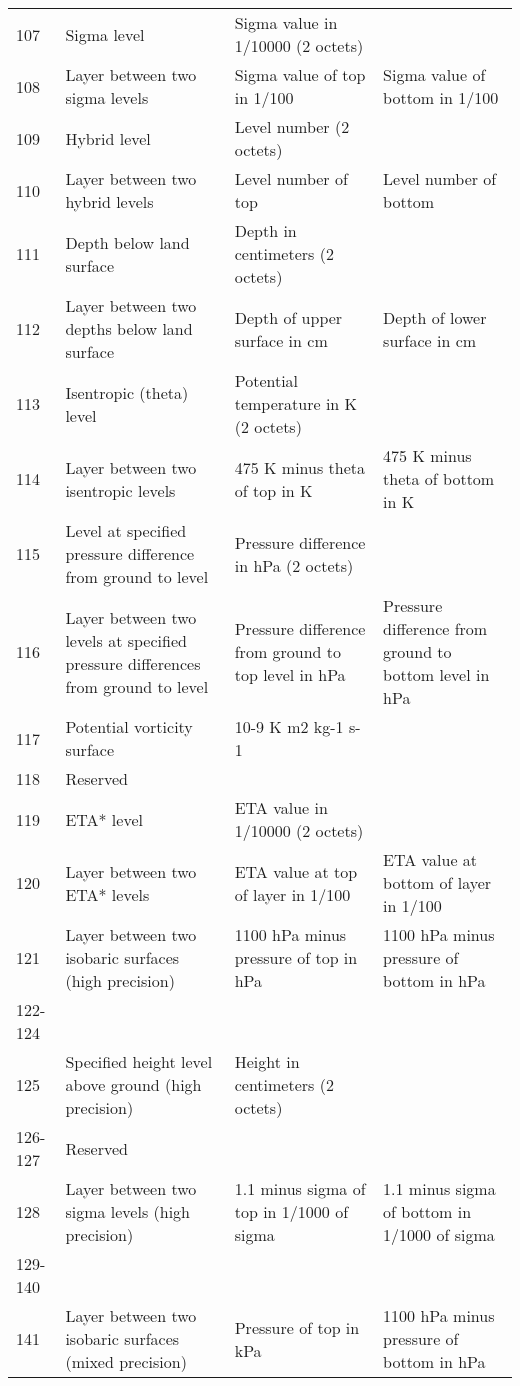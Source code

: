 \documentclass[draft,12pt,a4paper,twoside]{book}
\begin{document}
\begin{scriptsize}
\begin{longtable}{|@{\hspace{0.5mm}}l@{\hspace{0.5mm}}|@{\hspace{0.5mm}}p{4.0cm}@{\hspace{0.5mm}}|@{\hspace{0.5mm}}p{4.0cm}@{\hspace{0.5mm}}|@{\hspace{0.5mm}}p{4.0cm}@{\hspace{0.5mm}}|}
107     & Sigma level & Sigma value in 1/10000 (2 octets) & \\
108     & Layer between two sigma levels & Sigma value of top in 1/100 & Sigma value of bottom in 1/100 \\
109     & Hybrid level & Level number (2 octets) & \\
110     & Layer between two hybrid levels & Level number of top & Level number of bottom \\
111     & Depth below land surface & Depth in centimeters (2 octets) & \\
112     & Layer between two depths below land surface & Depth of upper surface in cm & Depth of lower surface in cm \\
113     & Isentropic (theta) level & Potential temperature in K (2 octets) & \\
114     & Layer between two isentropic levels & 475 K minus theta of top in K & 475 K minus theta of bottom in K \\
115     & Level at specified pressure difference from ground to level & Pressure difference in hPa (2 octets) & \\
116     & Layer between two levels at specified pressure differences from ground to level & Pressure difference from ground to top level in hPa & Pressure difference from ground to bottom level in hPa \\
117     & Potential vorticity surface & 10-9 K m2 kg-1 s-1 & \\
118     & Reserved & & \\
119     & ETA* level & ETA value in 1/10000 (2 octets) & \\
120     & Layer between two ETA* levels & ETA value at top of layer in 1/100 & ETA value at bottom of layer in 1/100 \\
121     & Layer between two isobaric surfaces (high precision) & 1100 hPa minus pressure of top in hPa & 1100 hPa minus pressure of bottom in hPa \\
122-124 & & & \\
125     & Specified height level above ground (high precision) & Height in centimeters (2 octets)  & \\
126-127 & Reserved & \\
128     & Layer between two sigma levels (high precision) & 1.1 minus sigma of top in 1/1000 of sigma & 1.1 minus sigma of bottom in 1/1000 of sigma \\
129-140 & & & \\
141     & Layer between two isobaric surfaces (mixed precision) & Pressure of top in kPa & 1100 hPa minus pressure of bottom in hPa \\

\end{longtable}
\end{scriptsize}
\end{document}

